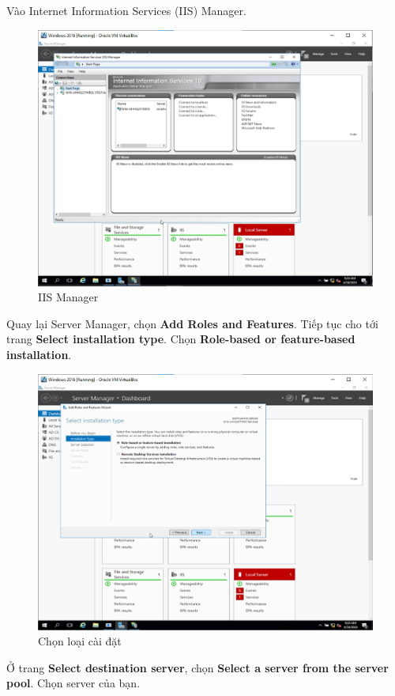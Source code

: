  Vào Internet Information Services (IIS) Manager. 

\begin{figure}[!htb]
    \centering
    \includegraphics[width=0.8\linewidth]{figure//chapter9//lab9_2/iis.png}
    \caption{IIS Manager}
    \label{fig:enter-label}
\end{figure}

 Quay lại Server Manager, chọn \textbf{Add Roles and Features}. Tiếp tục cho tới trang \textbf{Select installation type}. Chọn \textbf{Role-based or feature-based installation}.


\begin{figure}[!htb]
    \centering
    \includegraphics[width=0.8\linewidth]{figure//chapter9//lab9_2/installation-type.png}
    \caption{Chọn loại cài đặt}
    \label{fig:enter-label}
\end{figure}

\newpage

 Ở trang \textbf{Select destination server}, chọn \textbf{Select a server from the server pool}. Chọn server của bạn.

